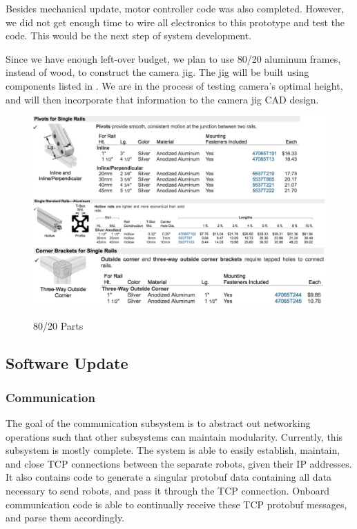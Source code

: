 Besides mechanical update, motor controller code was also completed. However, we did not get enough time to wire all electronics to this prototype and test the code. This would be the next step of system development.

Since we have enough left-over budget, we plan to use 80/20 aluminum frames, instead of wood, to construct the camera jig. The jig will be built using components listed in . We are in the process of testing camera’s optimal height, and will then incorporate that information to the camera jig CAD design.

\begin{figure}[h!]
\centering
\includegraphics[width=0.98\columnwidth]{CAD/8020.jpeg}
\label{fig:em4}
\caption{80/20 Parts}
\end{figure}

\subsection{Software Update}
\label{sec:software_progress}

\subsubsection{Communication}
The goal of the communication subsystem is to abstract out networking operations such that other subsystems can maintain modularity. Currently, this subsystem is mostly complete. The system is able to easily establish, maintain, and close TCP connections between the separate robots, given their IP addresses. It also contains code to generate a singular protobuf data containing all data necessary to send robots, and pass it through the TCP connection. Onboard communication code is able to continually receive these TCP protobuf messages, and parse them accordingly.

